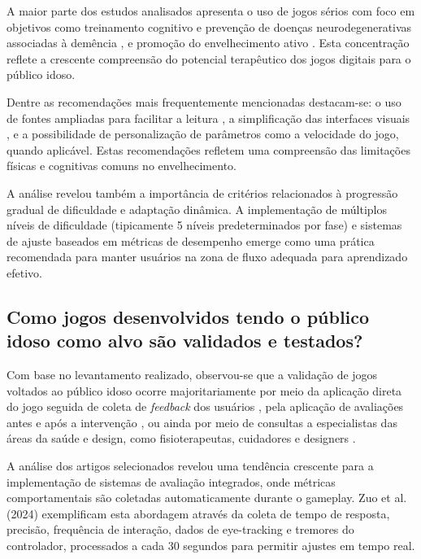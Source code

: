 \begin{table}[H]
A maior parte dos estudos analisados apresenta o uso de jogos sérios com foco em objetivos como treinamento cognitivo e prevenção de doenças neurodegenerativas associadas à demência \cite{yang2024serious, zuo2024development, caggianese2018towards}, e promoção do envelhecimento ativo \cite{nacimiento-garcia2024gamification}. Esta concentração reflete a crescente compreensão do potencial terapêutico dos jogos digitais para o público idoso.

Dentre as recomendações mais frequentemente mencionadas destacam-se: o uso de fontes ampliadas para facilitar a leitura \cite{tziraki2017designing}, a simplificação das interfaces visuais \cite{valladares2017design}, e a possibilidade de personalização de parâmetros como a velocidade do jogo, quando aplicável. Estas recomendações refletem uma compreensão das limitações físicas e cognitivas comuns no envelhecimento.

A análise revelou também a importância de critérios relacionados à progressão gradual de dificuldade e adaptação dinâmica. A implementação de múltiplos níveis de dificuldade (tipicamente 5 níveis predeterminados por fase) e sistemas de ajuste baseados em métricas de desempenho emerge como uma prática recomendada para manter usuários na zona de fluxo adequada para aprendizado efetivo.

\subsection{Como jogos desenvolvidos tendo o público idoso como alvo são validados e testados?}
\label{subsec:qp2}

Com base no levantamento realizado, observou-se que a validação de jogos voltados ao público idoso ocorre majoritariamente por meio da aplicação direta do jogo seguida de coleta de \textit{feedback} dos usuários \cite{merilampi2017cognitive}, pela aplicação de avaliações antes e após a intervenção \cite{wong2022effectiveness}, ou ainda por meio de consultas a especialistas das áreas da saúde e design, como fisioterapeutas, cuidadores e designers \cite{busca2024serious}.

A análise dos artigos selecionados revelou uma tendência crescente para a implementação de sistemas de avaliação integrados, onde métricas comportamentais são coletadas automaticamente durante o gameplay. Zuo et al. (2024) exemplificam esta abordagem através da coleta de tempo de resposta, precisão, frequência de interação, dados de eye-tracking e tremores do controlador, processados a cada 30 segundos para permitir ajustes em tempo real.


\end{table}
